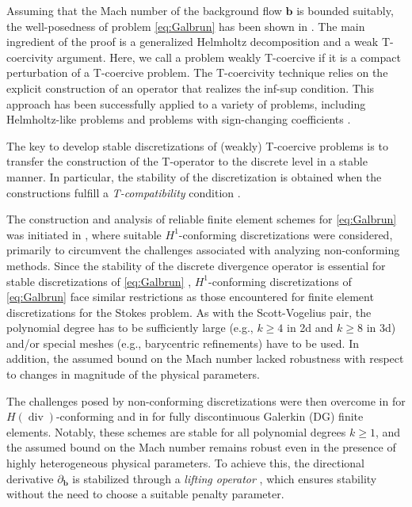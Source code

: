 \documentclass{m2an}
\newcommand{\bflow}{\mathbf{b}}
\renewcommand{\div}{\operatorname{div}}
\newcommand{\diffb}{\partial_{\bflow}}
\theoremstyle{plain}
\theoremstyle{definition}
\begin{document}
Assuming that the Mach number of the background flow $\bflow$ is bounded suitably, the well-posedness of problem \eqref{eq:Galbrun} has been shown in \cite{HH21}. The main ingredient of the proof is a generalized Helmholtz decomposition and a weak T-coercivity argument. Here, we call a problem weakly T-coercive if it is a compact perturbation of a T-coercive problem.
The T-coercivity technique \cite{BCS02,BCZ10,CC13} relies on the explicit construction of an operator that realizes the inf-sup condition.  
This approach has been successfully applied to a variety of problems, including Helmholtz-like problems \cite{Cia12,HN15,Halla21,vBZ24,FvBZ25} and problems with sign-changing coefficients \cite{BCZ10,DCC12,DCC14,HH024}. 

The key to develop stable discretizations of (weakly) T-coercive problems is to transfer the construction of the T-operator to the discrete level in a stable manner. In particular, the stability of the discretization is obtained when the constructions fulfill a \emph{T-compatibility} condition \cite{Halla21,HLS22H1}.

The construction and analysis of reliable finite element schemes for \eqref{eq:Galbrun} was initiated in \cite{HLS22H1}, where suitable $H^1$-conforming discretizations were considered, primarily to circumvent the challenges associated with analyzing non-conforming methods. Since the stability of the discrete divergence operator is essential for stable discretizations of \eqref{eq:Galbrun} \cite{AHLS22,HLS22H1}, $H^1$-conforming discretizations of \eqref{eq:Galbrun} face similar restrictions as those encountered for finite element discretizations for the Stokes problem. As with the Scott-Vogelius \cite{SV85} pair, the polynomial degree has to be sufficiently large (e.g., $k \ge 4$ in 2d and $k \ge 8$ in 3d) and/or special meshes (e.g., barycentric refinements) have to be used. In addition, the assumed bound on the Mach number lacked robustness with respect to changes in magnitude of the physical parameters.

The challenges posed by non-conforming discretizations were then overcome in \cite{H23Hdiv} for $H(\div)$-conforming and in \cite{Thesis_vB23} for fully discontinuous Galerkin (DG) finite elements. Notably, these schemes are stable for all polynomial degrees $k \ge 1$, and the assumed bound on the Mach number remains robust even in the presence of highly heterogeneous physical parameters. To achieve this, the directional derivative $\diffb$ is stabilized through a \emph{lifting operator} \cite{BR97,BMMPR00}, which ensures stability without the need to choose a suitable penalty parameter. 
\end{document}
